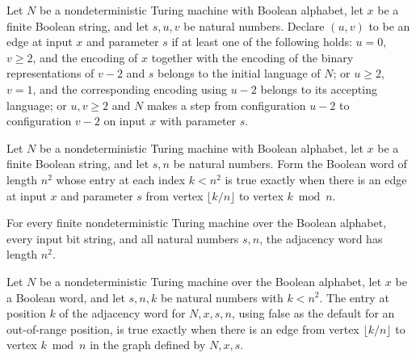 \begin{definition}
\label{Complexity.PathHard.Edge}
\leanok
{}
Let $N$ be a nondeterministic Turing machine with Boolean alphabet, let $x$ be a finite
Boolean string, and let $s,u,v$ be natural numbers. Declare $(u,v)$ to be an edge at
input $x$ and parameter $s$ if at least one of the following holds: $u=0$, $v\ge2$, and
the encoding of $x$ together with the encoding of the binary representations of $v-2$
and $s$ belongs to the initial language of $N$; or $u\ge2$, $v=1$, and the corresponding
encoding using $u-2$ belongs to its accepting language; or $u,v\ge2$ and $N$ makes a
step from configuration $u-2$ to configuration $v-2$ on input $x$ with parameter $s$.
\end{definition}

\begin{definition}
\label{Complexity.PathHard.adjWordE}
\leanok
{}
Let $N$ be a nondeterministic Turing machine with Boolean alphabet, let $x$ be a finite
Boolean string, and let $s,n$ be natural numbers. Form the Boolean word of length $n^2$
whose entry at each index $k<n^2$ is true exactly when there is an edge at input $x$ and
parameter $s$ from vertex $\lfloor k/n\rfloor$ to vertex $k\bmod n$.
\end{definition}

\begin{lemma}
\label{Complexity.PathHard.length_adjWordE}
\leanok
{}
For every finite nondeterministic Turing machine over the Boolean alphabet, every input
bit string, and all natural numbers $s,n$, the adjacency word has length $n^2$.
\end{lemma}

\begin{lemma}
\label{Complexity.PathHard.adjWordE_getD}
\leanok
{}
Let $N$ be a nondeterministic Turing machine over the Boolean alphabet, let $x$ be a
Boolean word, and let $s,n,k$ be natural numbers with $k<n^2$. The entry at position $k$
of the adjacency word for $N,x,s,n$, using false as the default for an out-of-range
position, is true exactly when there is an edge from vertex $\bigl\lfloor
k/n\bigr\rfloor$ to vertex $k \bmod n$ in the graph defined by $N,x,s$.
\end{lemma}

